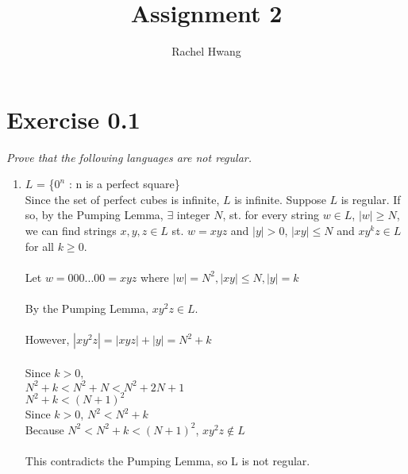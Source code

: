 \documentclass[a4paper]{article}
\title{Assignment 2}
\author{Rachel Hwang}
\begin{document}
\maketitle

\section{Exercise 0.1}
\emph{Prove that the following languages are not regular.}

\begin{enumerate}
\item $L$ = \{$0^n$ : n is a perfect square\} \\
Since the set of perfect cubes is infinite, $L$ is infinite. Suppose $L$ is regular. If so, by the Pumping Lemma, $\exists$ integer $N$, st. for every string $w \in L$, $|w| \ge N$, we can find strings $x, y, z \in L$ st. $w=xyz$ and $|y|>0$, $|xy| \le N$ and $xy^k z \in L$ for all $k \ge 0$. 
\\ \\
Let $w = 000...00 = xyz$ where $|w| = N^2, |xy| \le N, |y| = k$ \\
\\
By the Pumping Lemma, $xy^2 z \in L$. \\
\\
However, $|xy^2 z| = |xyz| + |y| = N^2+k$ \\
\\
Since $k>0,$ \\
$N^2 + k < N^2 + N < N^2 + 2N + 1$ \\
$N^2 + k < (N+1)^2$
\\
Since $k>0$, $N^2 < N^2 + k$ \\
Because $N^2 < N^2 + k < (N+1)^2$, $xy^2z \notin L$ \\
\\
This contradicts the Pumping Lemma, so L is not regular.
\\



\end{enumerate}
\end{document}
